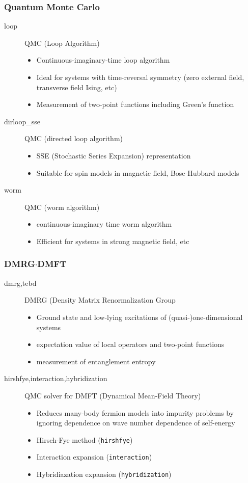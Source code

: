 \begin{frame}
  \frametitle{Quantum Monte Carlo}
  \begin{description}
  \item[loop] QMC (Loop Algorithm)
    \begin{itemize}
      \item Continuous-imaginary-time loop algorithm
      \item Ideal for systems with time-reversal symmetry (zero external field, transverse field Ising, etc)
      \item Measurement of two-point functions including Green's function
    \end{itemize}
  \item[dirloop\_sse] QMC (directed loop algorithm)
    \begin{itemize}
      \item SSE (Stochastic Series Expansion) representation
      \item Suitable for spin models in magnetic field, Bose-Hubbard models
    \end{itemize}
  \item[worm] QMC (worm algorithm)
    \begin{itemize}
      \item continuous-imaginary time worm algorithm
      \item Efficient for systems in strong magnetic field, etc
    \end{itemize}
  \end{description}
\end{frame}

\begin{frame}
  \frametitle{DMRG$\cdot$DMFT}
  \begin{description}
  \item[dmrg,tebd] DMRG (Density Matrix Renormalization Group
    \begin{itemize}
      \item Ground state and low-lying excitations of (quasi-)one-dimensional systems
      \item expectation value of local operators and two-point functions
      \item measurement of entanglement entropy
    \end{itemize}
  \item[hirshfye,interaction,hybridization] QMC solver for DMFT (Dynamical Mean-Field Theory)
    \begin{itemize}
      \item Reduces many-body fermion models into impurity problems by ignoring dependence on wave number dependence of self-energy
      \item Hirsch-Fye method ({\tt hirshfye})
      \item Interaction expansion ({\tt interaction})
      \item Hybridiazation expansion ({\tt hybridization})
    \end{itemize}
  \end{description}
\end{frame}


